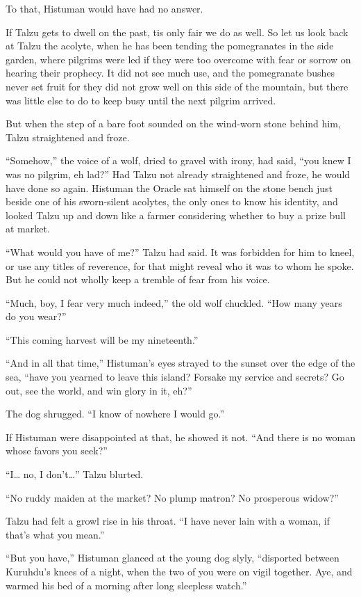 To that, Histuman would have had no answer.

\secdiv

\noindent If Talzu gets to dwell on the past, tis only fair we do as well. So let us look back at Talzu the acolyte, when he has been tending the pomegranates in the side garden, where pilgrims were led if they were too overcome with fear or sorrow on hearing their prophecy. It did not see much use, and the pomegranate bushes never set fruit for they did not grow well on this side of the mountain, but there was little else to do to keep busy until the next pilgrim arrived.

But when the step of a bare foot sounded on the wind-worn stone behind him, Talzu straightened and froze.

``Somehow,'' the voice of a wolf, dried to gravel with irony, had said, ``you knew I was no pilgrim, eh lad?'' Had Talzu not already straightened and froze, he would have done so again. Histuman the Oracle sat himself on the stone bench just beside one of his sworn-silent acolytes, the only ones to know his identity, and looked Talzu up and down like a farmer considering whether to buy a prize bull at market.

``What would you have of me?'' Talzu had said. It was forbidden for him to kneel, or use any titles of reverence, for that might reveal who it was to whom he spoke. But he could not wholly keep a tremble of fear from his voice.

``Much, boy, I fear very much indeed,'' the old wolf chuckled. ``How many years do you wear?''

``This coming harvest will be my nineteenth.''

``And in all that time,'' Histuman's eyes strayed to the sunset over the edge of the sea, ``have you yearned to leave this island? Forsake my service and secrets? Go out, see the world, and win glory in it, eh?''

The dog shrugged. ``I know of nowhere I would go.''

If Histuman were disappointed at that, he showed it not. ``And there is no woman whose favors you seek?''

``I\ldots{} no, I don't\ldots'' Talzu blurted.

``No ruddy maiden at the market? No plump matron? No prosperous widow?''

Talzu had felt a growl rise in his throat. ``I have never lain with a woman, if that's what you mean.''

``But you have,'' Histuman glanced at the young dog slyly, ``disported between Kuruhdu's knees of a night, when the two of you were on vigil together. Aye, and warmed his bed of a morning after long sleepless watch.''

